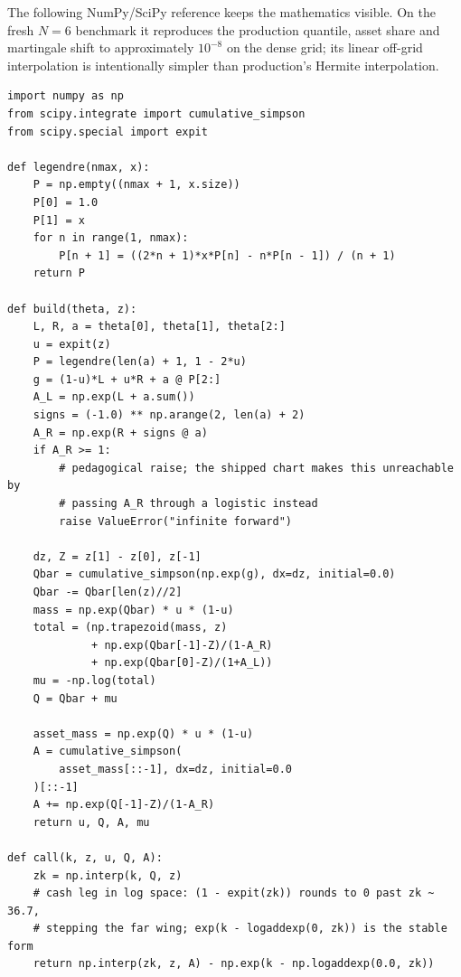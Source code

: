 \documentclass[11pt]{article}
\begin{document}
The following NumPy/SciPy reference keeps the mathematics visible.  On the
fresh $N=6$ benchmark it reproduces the production quantile, asset share and
martingale shift to approximately $10^{-8}$ on the dense grid; its linear
off-grid interpolation is intentionally simpler than production's Hermite
interpolation.

\begin{lstlisting}[caption={A compact LQD slice and call pricer.},
label={lst:reference}]
import numpy as np
from scipy.integrate import cumulative_simpson
from scipy.special import expit

def legendre(nmax, x):
    P = np.empty((nmax + 1, x.size))
    P[0] = 1.0
    P[1] = x
    for n in range(1, nmax):
        P[n + 1] = ((2*n + 1)*x*P[n] - n*P[n - 1]) / (n + 1)
    return P

def build(theta, z):
    L, R, a = theta[0], theta[1], theta[2:]
    u = expit(z)
    P = legendre(len(a) + 1, 1 - 2*u)
    g = (1-u)*L + u*R + a @ P[2:]
    A_L = np.exp(L + a.sum())
    signs = (-1.0) ** np.arange(2, len(a) + 2)
    A_R = np.exp(R + signs @ a)
    if A_R >= 1:
        # pedagogical raise; the shipped chart makes this unreachable by
        # passing A_R through a logistic instead
        raise ValueError("infinite forward")

    dz, Z = z[1] - z[0], z[-1]
    Qbar = cumulative_simpson(np.exp(g), dx=dz, initial=0.0)
    Qbar -= Qbar[len(z)//2]
    mass = np.exp(Qbar) * u * (1-u)
    total = (np.trapezoid(mass, z)
             + np.exp(Qbar[-1]-Z)/(1-A_R)
             + np.exp(Qbar[0]-Z)/(1+A_L))
    mu = -np.log(total)
    Q = Qbar + mu

    asset_mass = np.exp(Q) * u * (1-u)
    A = cumulative_simpson(
        asset_mass[::-1], dx=dz, initial=0.0
    )[::-1]
    A += np.exp(Q[-1]-Z)/(1-A_R)
    return u, Q, A, mu

def call(k, z, u, Q, A):
    zk = np.interp(k, Q, z)
    # cash leg in log space: (1 - expit(zk)) rounds to 0 past zk ~ 36.7,
    # stepping the far wing; exp(k - logaddexp(0, zk)) is the stable form
    return np.interp(zk, z, A) - np.exp(k - np.logaddexp(0.0, zk))
\end{lstlisting}
\end{document}
